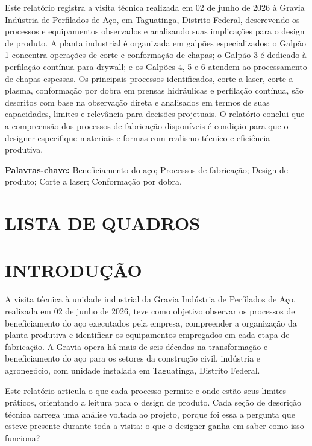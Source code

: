 \documentclass[12pt,a4paper,oneside,brazil,chapter=TITLE]{article}
\makeatletter
\newcommand{\secbreak}{\clearpage}
\let\oldsection\section
\renewcommand{\section}{\secbreak\oldsection}
\renewcommand{\listofquadros}{\section*{LISTA DE QUADROS}\@starttoc{loq}}
\makeatother
\begin{document}
Este relatório registra a visita técnica realizada em 02 de junho de 2026 à Gravia Indústria de Perfilados de Aço, em Taguatinga, Distrito Federal, descrevendo os processos e equipamentos observados e analisando suas implicações para o design de produto. A planta industrial é organizada em galpões especializados: o Galpão 1 concentra operações de corte e conformação de chapas; o Galpão 3 é dedicado à perfilação contínua para drywall; e os Galpões 4, 5 e 6 atendem ao processamento de chapas espessas. Os principais processos identificados, corte a laser, corte a plasma, conformação por dobra em prensas hidráulicas e perfilação contínua, são descritos com base na observação direta e analisados em termos de suas capacidades, limites e relevância para decisões projetuais. O relatório conclui que a compreensão dos processos de fabricação disponíveis é condição para que o designer especifique materiais e formas com realismo técnico e eficiência produtiva.

\vspace{1em}
\noindent\textbf{Palavras-chave:} Beneficiamento do aço; Processos de fabricação; Design de produto; Corte a laser; Conformação por dobra.

\clearpage
\listofquadros
\thispagestyle{plain}

\clearpage
\tableofcontents
\thispagestyle{plain}


\section{INTRODUÇÃO}

A visita técnica à unidade industrial da Gravia Indústria de Perfilados de Aço, realizada em 02 de junho de 2026, teve como objetivo observar os processos de beneficiamento do aço executados pela empresa, compreender a organização da planta produtiva e identificar os equipamentos empregados em cada etapa de fabricação. A Gravia opera há mais de seis décadas na transformação e beneficiamento do aço para os setores da construção civil, indústria e agronegócio, com unidade instalada em Taguatinga, Distrito Federal.

Este relatório articula o que cada processo permite e onde estão seus limites práticos, orientando a leitura para o design de produto. Cada seção de descrição técnica carrega uma análise voltada ao projeto, porque foi essa a pergunta que esteve presente durante toda a visita: o que o designer ganha em saber como isso funciona?
\end{document}
